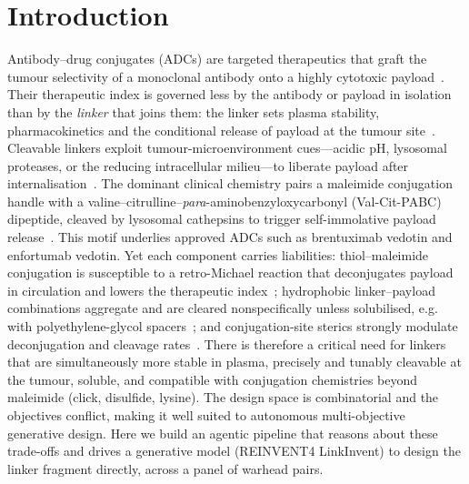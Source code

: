\documentclass[10pt]{article}
\begin{document}
\section{Introduction}
Antibody--drug conjugates (ADCs) are targeted therapeutics that graft the tumour selectivity of a monoclonal antibody onto a highly cytotoxic payload~\cite{su2021,balamkundu2023}. Their therapeutic index is governed less by the antibody or payload in isolation than by the \emph{linker} that joins them: the linker sets plasma stability, pharmacokinetics and the conditional release of payload at the tumour site~\cite{su2021zhang}. Cleavable linkers exploit tumour-microenvironment cues---acidic pH, lysosomal proteases, or the reducing intracellular milieu---to liberate payload after internalisation~\cite{peng2021}.
The dominant clinical chemistry pairs a maleimide conjugation handle with a valine--citrulline--\emph{para}-aminobenzyloxycarbonyl (Val-Cit-PABC) dipeptide, cleaved by lysosomal cathepsins to trigger self-immolative payload release~\cite{balamkundu2023}. This motif underlies approved ADCs such as brentuximab vedotin and enfortumab vedotin. Yet each component carries liabilities: thiol--maleimide conjugation is susceptible to a retro-Michael reaction that deconjugates payload in circulation and lowers the therapeutic index~\cite{su2021}; hydrophobic linker--payload combinations aggregate and are cleared nonspecifically unless solubilised, e.g. with polyethylene-glycol spacers~\cite{su2021}; and conjugation-site sterics strongly modulate deconjugation and cleavage rates~\cite{su2021zhang}.
There is therefore a critical need for linkers that are simultaneously more stable in plasma, precisely and tunably cleavable at the tumour, soluble, and compatible with conjugation chemistries beyond maleimide (click, disulfide, lysine). The design space is combinatorial and the objectives conflict, making it well suited to autonomous multi-objective generative design. Here we build an agentic pipeline that reasons about these trade-offs and drives a generative model (REINVENT4 LinkInvent) to design the linker fragment directly, across a panel of warhead pairs.
\end{document}
